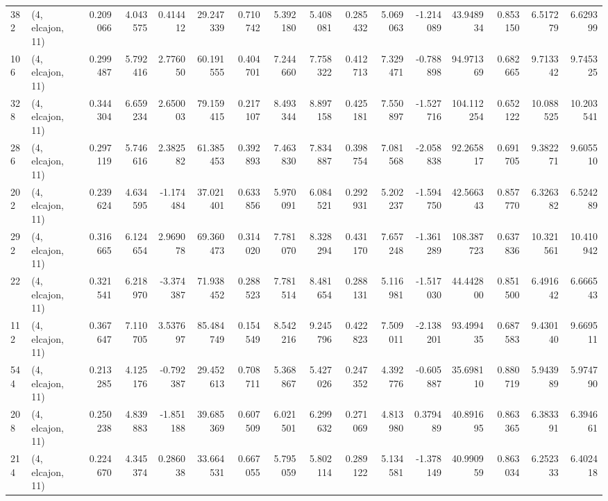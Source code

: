 \begin{tabular}{llrrrrrrrrrrrrrr}
382 &  (4, elcajon, 11) &   0.209066 &   4.043575 &   0.414412 &    29.247339 &   0.710742 &   5.392180 &   5.408081 &  0.285432 &   5.069063 &  -1.214089 &    43.948934 &  0.853150 &   6.517279 &   6.629399 \\
106 &  (4, elcajon, 11) &   0.299487 &   5.792416 &   2.776050 &    60.191555 &   0.404701 &   7.244660 &   7.758322 &  0.412713 &   7.329471 &  -0.788898 &    94.971369 &  0.682665 &   9.713342 &   9.745325 \\
328 &  (4, elcajon, 11) &   0.344304 &   6.659234 &   2.650003 &    79.159415 &   0.217107 &   8.493344 &   8.897158 &  0.425181 &   7.550897 &  -1.527716 &   104.112254 &  0.652122 &  10.088525 &  10.203541 \\
286 &  (4, elcajon, 11) &   0.297119 &   5.746616 &   2.382582 &    61.385453 &   0.392893 &   7.463830 &   7.834887 &  0.398754 &   7.081568 &  -2.058838 &    92.265817 &  0.691705 &   9.382271 &   9.605510 \\
202 &  (4, elcajon, 11) &   0.239624 &   4.634595 &  -1.174484 &    37.021401 &   0.633856 &   5.970091 &   6.084521 &  0.292931 &   5.202237 &  -1.594750 &    42.566343 &  0.857770 &   6.326382 &   6.524289 \\
292 &  (4, elcajon, 11) &   0.316665 &   6.124654 &   2.969078 &    69.360473 &   0.314020 &   7.781070 &   8.328294 &  0.431170 &   7.657248 &  -1.361289 &   108.387723 &  0.637836 &  10.321561 &  10.410942 \\
22  &  (4, elcajon, 11) &   0.321541 &   6.218970 &  -3.374387 &    71.938452 &   0.288523 &   7.781514 &   8.481654 &  0.288131 &   5.116981 &  -1.517030 &    44.442800 &  0.851500 &   6.491642 &   6.666543 \\
112 &  (4, elcajon, 11) &   0.367647 &   7.110705 &   3.537697 &    85.484749 &   0.154549 &   8.542216 &   9.245796 &  0.422823 &   7.509011 &  -2.138201 &    93.499435 &  0.687583 &   9.430140 &   9.669511 \\
544 &  (4, elcajon, 11) &   0.213285 &   4.125176 &  -0.792387 &    29.452613 &   0.708711 &   5.368867 &   5.427026 &  0.247352 &   4.392776 &  -0.605887 &    35.698110 &  0.880719 &   5.943989 &   5.974790 \\
208 &  (4, elcajon, 11) &   0.250238 &   4.839883 &  -1.851188 &    39.685369 &   0.607509 &   6.021501 &   6.299632 &  0.271069 &   4.813980 &   0.379489 &    40.891695 &  0.863365 &   6.383391 &   6.394661 \\
214 &  (4, elcajon, 11) &   0.224670 &   4.345374 &   0.286038 &    33.664531 &   0.667055 &   5.795059 &   5.802114 &  0.289122 &   5.134581 &  -1.378149 &    40.990959 &  0.863034 &   6.252333 &   6.402418 \\

\end{tabular}

